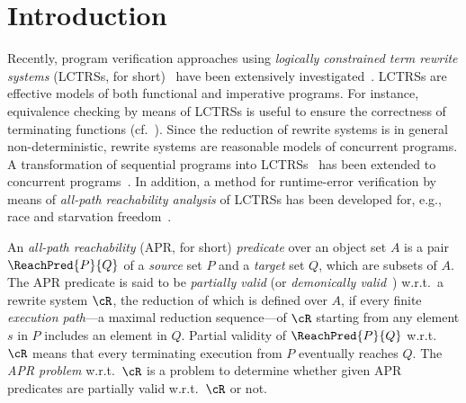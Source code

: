 \section{Introduction}
\label{sec:intro}

Recently, program verification approaches using \emph{logically constrained term rewrite systems} (LCTRSs, for short)~\cite{KN13frocos} have been extensively investigated~\cite{FKN17tocl,WM18,CL18,NW18vstte,KN18eptcs,KNS19ss,CLB23,MNKS23wst,KNM25jlamp,MFK25}.
LCTRSs are effective models of both functional and imperative programs. For instance, equivalence checking by means of LCTRSs is useful to ensure the correctness of terminating functions (cf.~\cite{FKN17tocl}).
Since the reduction of rewrite systems is in general non-deterministic, rewrite systems are reasonable models of concurrent programs.
A transformation of sequential programs into LCTRSs~\cite{FKN17tocl,KN18eptcs} has been extended to concurrent programs~\cite{KNM25jlamp}.
In addition, a method for runtime-error verification by means of \emph{all-path reachability analysis} of LCTRSs has been developed for, e.g., race and starvation freedom~\cite{KN23jlamp,KN23padl,KN24rp}.

An \emph{all-path reachability} (APR, for short) \emph{predicate} over an object set $A$ is a pair $\ReachPred{P}{Q}$ of a \emph{source} set $P$ and a \emph{target} set $Q$, which are subsets of $A$.
The APR predicate is said to be \emph{partially valid} (or \emph{demonically valid}~\cite[Definition~5]{CL18}) w.r.t.\ a rewrite system $\cR$, the reduction of which is defined over $A$, if every finite \emph{execution path}---a maximal reduction sequence---of $\cR$ starting from any element $s$ in $P$ includes an element in $Q$.
Partial validity of $\ReachPred{P}{Q}$ w.r.t.\ $\cR$ means that
every terminating execution from $P$ eventually reaches $Q$.
The \emph{APR problem} w.r.t.\ $\cR$ is a problem to determine whether given APR predicates are partially valid w.r.t.\ $\cR$ or not.

